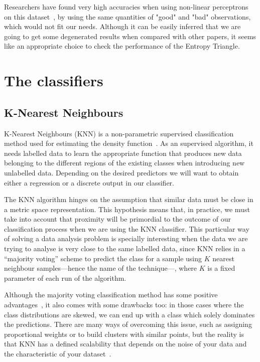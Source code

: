 Researchers have found very high accuracies when using non-linear perceptrons on this dataset~\cite{Sigillito1989ClassificationOR}, by using the same quantities of "good" and "bad" observations, which would not fit our needs. Although it can be easily inferred that we are going to get some degenerated results when compared with other papers, it seems like an appropriate choice to check the performance of the Entropy Triangle. \par 

\section{The classifiers}
\subsection{K-Nearest Neighbours}

K-Nearest Neighbours (KNN) is a non-parametric supervised classification method used for estimating the density function~\cite{mur:12}. As an supervised algorithm, it needs labelled data to learn the appropriate function that produces new data belonging to the different regions of the existing classes when introducing new unlabelled data. Depending on the desired predictors we will want to obtain either a regression or a discrete output in our classifier. 

The KNN algorithm hinges on the assumption that similar data must be close in a metric space representation. This hypothesis means that, in practice, we must take into account that proximity will be primordial to the outcome of our classification process when we are using the KNN classifier. This particular way of solving a data analysis problem is specially interesting when the data we are trying to analyse is very close to the same labelled data, since KNN relies in a ``majority voting'' scheme to predict the class for a sample using $K$ nearest neighbour samples---hence the name of the technique---, where $K$ is a fixed parameter of each run of the algorithm. 

Although the majority voting classification method has some positive advantages~\cite{citation}, it also comes with some drawbacks too: in those cases where the class distributions are skewed, we can end up with a class which solely dominates the predictions. There are many ways of overcoming this issue, such as assigning proportional weights or to build clusters with similar points, but the reality is that KNN has a defined scalability that depends on the noise of your data and the characteristic of your dataset~\cite{citation}. \par

